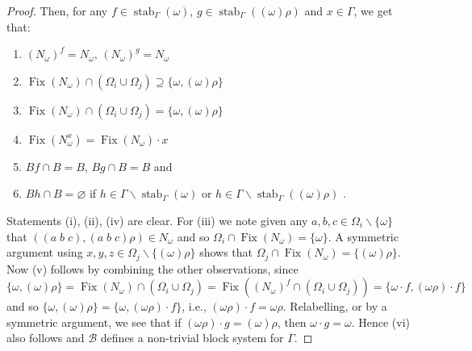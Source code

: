 \documentclass[11pt,a4paper]{amsart}
\renewcommand{\setminus}{\smallsetminus}
\renewcommand{\emptyset}{\varnothing}
\theoremstyle{definition}
\theoremstyle{remark}
\newcommand{\fix}{\operatorname{Fix}}
\newcommand{\B}{\mathcal B}
\newcommand{\stab}{\operatorname{stab}}
\begin{document}
\begin{proof}
	 Then, for any $f\in \stab_\Gamma(\omega)$, $g \in \stab_{\Gamma}((\omega)\rho)$ and $x\in \Gamma$, we get that:
	 \begin{enumerate}
	 	\item $(N_\omega)^f=N_\omega$, $(N_\omega)^g=N_\omega$
	 	\item $\fix(N_\omega) \cap (\Omega_i \cup \Omega_j)\supseteq \{\omega, (\omega)\rho\}$
	 	\item $\fix(N_\omega) \cap (\Omega_i \cup \Omega_j) = \{\omega, (\omega)\rho\}$
	 	\item $\fix(N_\omega^x)=\fix(N_\omega)\cdot x$
	 	\item $B f\cap B = B$, $Bg \cap B=B$ and
	 	\item $B h\cap B = \emptyset$ if $h\in \Gamma\setminus \stab_\Gamma(\omega)$ or $h \in \Gamma\setminus \stab_\Gamma((\omega)\rho)$ .
	 \end{enumerate}
	 Statements (i), (ii), (iv) are clear. For (iii) we note given any $a, b, c \in \Omega_i\setminus\{\omega\}$ that $((a\;b\;c), (a\;b\;c)\rho)\in N_{\omega}$ and so $\Omega_i\cap \fix(N_\omega)=\{\omega\}$. A symmetric argument using $x, y, z\in \Omega_j\setminus\{(\omega)\rho\}$ shows that $\Omega_j\cap \fix (N_{\omega}) =\{(\omega)\rho\}$. Now (v) follows by combining the other observations, since
	 $$\{\omega, (\omega)\rho\}=\fix(N_\omega) \cap (\Omega_i \cup \Omega_j)=\fix((N_\omega)^f \cap (\Omega_i \cup \Omega_j))=\{\omega \cdot f, (\omega\rho)\cdot f\}$$
	 and so $\{\omega, (\omega)\rho\}=\{\omega, (\omega\rho)\cdot f\}$, i.e., $(\omega\rho)\cdot f=\omega\rho$. Relabelling, or by a symmetric argument, we see that if $(\omega\rho)\cdot g=(\omega)\rho$, then $\omega\cdot g=\omega$. Hence (vi) also follows and $\B$ defines a non-trivial block system for $\Gamma$.
\end{proof}

\JordanWielandt
\end{document}
